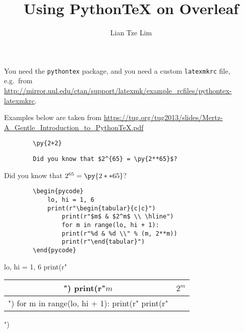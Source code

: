 \documentclass[12pt,a4paper]{scrartcl}
\title{Using PythonTeX on Overleaf}
\author{Lian Tze Lim}
\date{}
\begin{document}
	
	\maketitle
	
	You need the \texttt{pythontex} package, and you need a custom \texttt{latexmkrc} file, e.g.~from \url{http://mirror.unl.edu/ctan/support/latexmk/example_rcfiles/pythontex-latexmkrc}.
	
	Examples below are taken from \url{https://tug.org/tug2013/slides/Mertz-A_Gentle_Introduction_to_PythonTeX.pdf}
	
	\begin{verbatim}
		\py{2+2}
	\end{verbatim}
	
	
	
	\begin{verbatim}
		Did you know that $2^{65} = \py{2**65}$?
	\end{verbatim}
	
	Did you know that $2^{65} = \py{2**65}$?
	
	
	\begin{verbatim}
		\begin{pycode}
			lo, hi = 1, 6
			print(r"\begin{tabular}{c|c}")
				print(r"$m$ & $2^m$ \\ \hline")
				for m in range(lo, hi + 1):
				print(r"%d & %d \\" % (m, 2**m))
				print(r"\end{tabular}")
		\end{pycode}
	\end{verbatim}
	
	
	\begin{pycode}
		lo, hi = 1, 6
		print(r"\begin{tabular}{c|c}")
			print(r"$m$ & $2^m$ \\ \hline")
			for m in range(lo, hi + 1):
			print(r"%
			print(r"\end{tabular}")
	\end{pycode}
	
\end{document}
